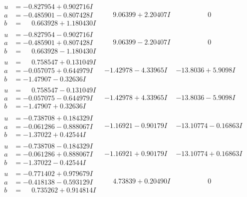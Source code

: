 \documentclass[1p]{elsarticle_modified}
\theoremstyle{definition}
\begin{document}
$$\begin{array}{c|c|c}
\begin{aligned}
u &= -0.827954 + 0.902716 I \\
a &= -0.485901 - 0.807428 I \\
b &= \phantom{-}0.663928 + 1.180430 I\end{aligned}
 & \phantom{-}9.06399 + 2.20407 I & \phantom{-0.000000 } 0 \\ \hline\begin{aligned}
u &= -0.827954 - 0.902716 I \\
a &= -0.485901 + 0.807428 I \\
b &= \phantom{-}0.663928 - 1.180430 I\end{aligned}
 & \phantom{-}9.06399 - 2.20407 I & \phantom{-0.000000 } 0 \\ \hline\begin{aligned}
u &= \phantom{-}0.758547 + 0.131049 I \\
a &= -0.057075 + 0.644979 I \\
b &= -1.47907 - 0.32636 I\end{aligned}
 & -1.42978 - 4.33965 I & -13.8036 + 5.9098 I \\ \hline\begin{aligned}
u &= \phantom{-}0.758547 - 0.131049 I \\
a &= -0.057075 - 0.644979 I \\
b &= -1.47907 + 0.32636 I\end{aligned}
 & -1.42978 + 4.33965 I & -13.8036 - 5.9098 I \\ \hline\begin{aligned}
u &= -0.738708 + 0.184329 I \\
a &= -0.061286 - 0.888067 I \\
b &= -1.37022 + 0.42544 I\end{aligned}
 & -1.16921 - 0.90179 I & -13.10774 - 0.16863 I \\ \hline\begin{aligned}
u &= -0.738708 - 0.184329 I \\
a &= -0.061286 + 0.888067 I \\
b &= -1.37022 - 0.42544 I\end{aligned}
 & -1.16921 + 0.90179 I & -13.10774 + 0.16863 I \\ \hline\begin{aligned}
u &= -0.771402 + 0.979679 I \\
a &= -0.418138 - 0.593129 I \\
b &= \phantom{-}0.735262 + 0.914814 I\end{aligned}
 & \phantom{-}4.73839 + 0.20490 I & \phantom{-0.000000 } 0 \\ \hline\begin{aligned}

\end{aligned}
\end{array}$$
\end{document}
